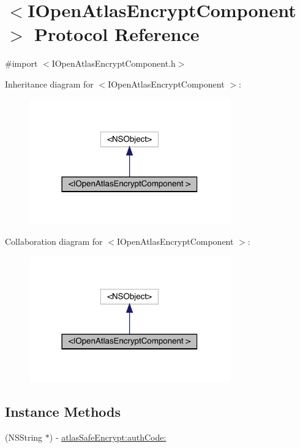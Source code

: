 \hypertarget{protocol_i_open_atlas_encrypt_component_01-p}{}\section{$<$I\+Open\+Atlas\+Encrypt\+Component $>$ Protocol Reference}
\label{protocol_i_open_atlas_encrypt_component_01-p}


{\ttfamily \#import $<$I\+Open\+Atlas\+Encrypt\+Component.\+h$>$}



Inheritance diagram for $<$I\+Open\+Atlas\+Encrypt\+Component $>$\+:\nopagebreak
\begin{figure}[H]
\begin{center}
\leavevmode
\includegraphics[width=246pt]{protocol_i_open_atlas_encrypt_component_01-p__inherit__graph}
\end{center}
\end{figure}


Collaboration diagram for $<$I\+Open\+Atlas\+Encrypt\+Component $>$\+:\nopagebreak
\begin{figure}[H]
\begin{center}
\leavevmode
\includegraphics[width=246pt]{protocol_i_open_atlas_encrypt_component_01-p__coll__graph}
\end{center}
\end{figure}
\subsection*{Instance Methods}
\begin{DoxyCompactItemize}
\item 
(N\+S\+String $\ast$) -\/ \mbox{\hyperlink{protocol_i_open_atlas_encrypt_component_01-p_a04c89f6ec9e95172f1bd3ee2ab100a72}{atlas\+Safe\+Encrypt\+:auth\+Code\+:}}
\end{DoxyCompactItemize}


